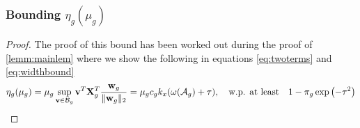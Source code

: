 \subsubsection{Bounding $\eta_g(\mu_g)$}
\begin{proof}
	The proof of this bound has been worked out during the proof of \cref{lemm:mainlem} where we show the following in equations \cref{eq:twoterms} and \cref{eq:widthbound}
	\[
	\eta_g(\mu_g) = \mu_g \sup_{\v \in \cB_g} \v^T \X_g^T \frac{\w_g}{\norm{\w_g}{2}} = \mu_g c_g k_x (\omega(\cA_g) + \tau), \quad \text{w.p. at least} \quad 1 - \pi_g \exp\left( -\tau^2 \right)
	\]
\end{proof}


